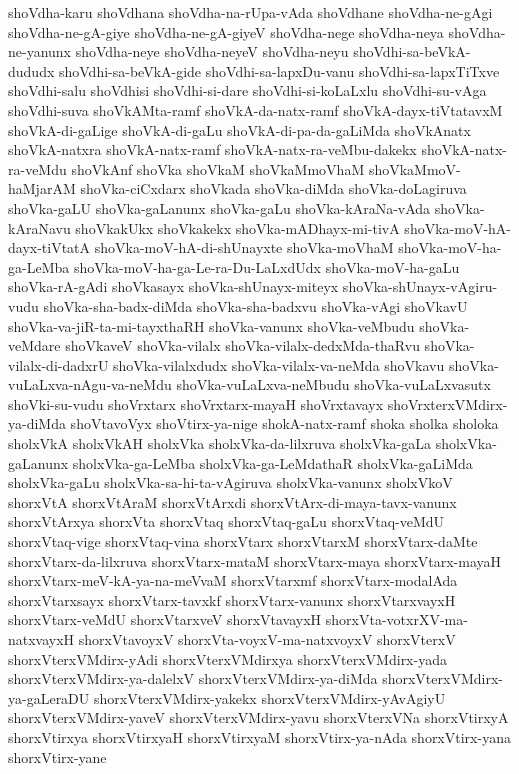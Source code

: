 {shoVdha-karu
shoVdhana
shoVdha-na-rUpa-vAda
shoVdhane
shoVdha-ne-gAgi
shoVdha-ne-gA-giye
shoVdha-ne-gA-giyeV
shoVdha-nege
shoVdha-neya
shoVdha-ne-yanunx
shoVdha-neye
shoVdha-neyeV
shoVdha-neyu
shoVdhi-sa-beVkA-dududx
shoVdhi-sa-beVkA-gide
shoVdhi-sa-lapxDu-vanu
shoVdhi-sa-lapxTiTxve
shoVdhi-salu
shoVdhisi
shoVdhi-si-dare
shoVdhi-si-koLaLxlu
shoVdhi-su-vAga
shoVdhi-suva
shoVkAMta-ramf
shoVkA-da-natx-ramf
shoVkA-dayx-tiVtatavxM
shoVkA-di-gaLige
shoVkA-di-gaLu
shoVkA-di-pa-da-gaLiMda
shoVkAnatx
shoVkA-natxra
shoVkA-natx-ramf
shoVkA-natx-ra-veMbu-dakekx
shoVkA-natx-ra-veMdu
shoVkAnf
shoVka
shoVkaM
shoVkaMmoVhaM
shoVkaMmoV-haMjarAM
shoVka-ciCxdarx
shoVkada
shoVka-diMda
shoVka-doLagiruva
shoVka-gaLU
shoVka-gaLanunx
shoVka-gaLu
shoVka-kAraNa-vAda
shoVka-kAraNavu
shoVkakUkx
shoVkakekx
shoVka-mADhayx-mi-tivA
shoVka-moV-hA-dayx-tiVtatA
shoVka-moV-hA-di-shUnayxte
shoVka-moVhaM
shoVka-moV-ha-ga-LeMba
shoVka-moV-ha-ga-Le-ra-Du-LaLxdUdx
shoVka-moV-ha-gaLu
shoVka-rA-gAdi
shoVkasayx
shoVka-shUnayx-miteyx
shoVka-shUnayx-vAgiru-vudu
shoVka-sha-badx-diMda
shoVka-sha-badxvu
shoVka-vAgi
shoVkavU
shoVka-va-jiR-ta-mi-tayxthaRH
shoVka-vanunx
shoVka-veMbudu
shoVka-veMdare
shoVkaveV
shoVka-vilalx
shoVka-vilalx-dedxMda-thaRvu
shoVka-vilalx-di-dadxrU
shoVka-vilalxdudx
shoVka-vilalx-va-neMda
shoVkavu
shoVka-vuLaLxva-nAgu-va-neMdu
shoVka-vuLaLxva-neMbudu
shoVka-vuLaLxvasutx
shoVki-su-vudu
shoVrxtarx
shoVrxtarx-mayaH
shoVrxtavayx
shoVrxterxVMdirx-ya-diMda
shoVtavoVyx
shoVtirx-ya-nige
shokA-natx-ramf
shoka
sholka
sholoka
sholxVkA
sholxVkAH
sholxVka
sholxVka-da-lilxruva
sholxVka-gaLa
sholxVka-gaLanunx
sholxVka-ga-LeMba
sholxVka-ga-LeMdathaR
sholxVka-gaLiMda
sholxVka-gaLu
sholxVka-sa-hi-ta-vAgiruva
sholxVka-vanunx
sholxVkoV
shorxVtA
shorxVtAraM
shorxVtArxdi
shorxVtArx-di-maya-tavx-vanunx
shorxVtArxya
shorxVta
shorxVtaq
shorxVtaq-gaLu
shorxVtaq-veMdU
shorxVtaq-vige
shorxVtaq-vina
shorxVtarx
shorxVtarxM
shorxVtarx-daMte
shorxVtarx-da-lilxruva
shorxVtarx-mataM
shorxVtarx-maya
shorxVtarx-mayaH
shorxVtarx-meV-kA-ya-na-meVvaM
shorxVtarxmf
shorxVtarx-modalAda
shorxVtarxsayx
shorxVtarx-tavxkf
shorxVtarx-vanunx
shorxVtarxvayxH
shorxVtarx-veMdU
shorxVtarxveV
shorxVtavayxH
shorxVta-votxrXV-ma-natxvayxH
shorxVtavoyxV
shorxVta-voyxV-ma-natxvoyxV
shorxVterxV
shorxVterxVMdirx-yAdi
shorxVterxVMdirxya
shorxVterxVMdirx-yada
shorxVterxVMdirx-ya-dalelxV
shorxVterxVMdirx-ya-diMda
shorxVterxVMdirx-ya-gaLeraDU
shorxVterxVMdirx-yakekx
shorxVterxVMdirx-yAvAgiyU
shorxVterxVMdirx-yaveV
shorxVterxVMdirx-yavu
shorxVterxVNa
shorxVtirxyA
shorxVtirxya
shorxVtirxyaH
shorxVtirxyaM
shorxVtirx-ya-nAda
shorxVtirx-yana
shorxVtirx-yane
}

